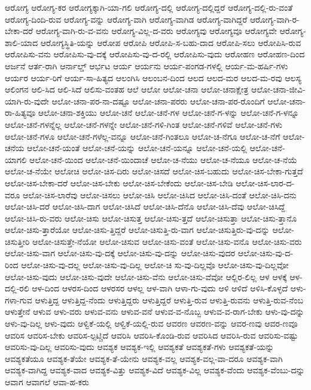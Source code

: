 {ಆರೋಗ್ಯ
ಆರೋಗ್ಯ-ಕರ
ಆರೋಗ್ಯಕ್ಕಾಗಿ-ಯಾ-ಗಲಿ
ಆರೋಗ್ಯ-ದಲ್ಲಿ
ಆರೋಗ್ಯ-ದಲ್ಲಿದ್ದರೆ
ಆರೋಗ್ಯ-ದಲ್ಲಿ-ರು-ವಂತೆ
ಆರೋಗ್ಯ-ದಿಂದಿ-ರುವ
ಆರೋಗ್ಯ-ವನ್ನು
ಆರೋಗ್ಯ-ವಾಗಿ
ಆರೋಗ್ಯ-ವಾಗಿಡ
ಆರೋಗ್ಯ-ವಾಗಿದ್ದರೆ
ಆರೋಗ್ಯ-ವಾಗಿ-ರ-ಬೇಕಾ-ದರೆ
ಆರೋಗ್ಯ-ವಾಗಿ-ರು-ವ-ವನು
ಆರೋಗ್ಯ-ವಿಲ್ಲ-ದ-ವರು
ಆರೋಗ್ಯವು
ಆರೋಗ್ಯವೂ
ಆರೋಗ್ಯವೇ
ಆರೋಗ್ಯ-ಶಾಲಿ-ಯಾದ
ಆರೋಗ್ಯಸ್ಥಿತಿ-ಯನ್ನು
ಆರೋಪ
ಆರೋಪಿ
ಆರೋಪಿ-ಸ-ಬಹು-ದಾದ
ಆರೋಪಿ-ಸಲು
ಆರೋಪಿಸಿ-ರುವ
ಆರೋಪಿಸು-ವನು
ಆರೋಪಿಸು-ವು-ದಕ್ಕೆ
ಆರೋಪಿಸು-ವು-ದ-ರಲ್ಲಿ
ಆರೋಪಿಸು-ವುದು
ಆರೋಹಣ
ಆರೋಹಣ-ದಿಂದ
ಆರ್ಜನೆ
ಆರ್ತ-ರಾಗಿ
ಆರ್ನಾಲ್ಡ್
ಆರ್ಭಟ
ಆರ್ಯ
ಆರ್ಯನು
ಆರ್ಯ-ಪಂಗಡ-ಗಳಲ್ಲಿ
ಆರ್ಯ-ಮ-ಹರ್ಷಿ-ಗಳು
ಆರ್ಯರ
ಆರ್ಯ-ರಿಗೆ
ಆರ್ಯ-ಸಾ-ಹಿತ್ಯದ
ಆಲಂಗಿಸಿ
ಆಲಂಬನ-ದಿಂದ
ಆಲದ
ಆಲದ-ಮರ
ಆಲದ-ಮ-ರವು
ಆಲಸ್ಯ
ಆಲಿಂಗನ
ಆಲಿ-ಸಿದ
ಆಲಿ-ಸಿದೆ
ಆಲಿಸು-ವಂತಹ
ಆಲೆ
ಆಲೋ
ಆಲೋ-ಚನಾ
ಆಲೋ-ಚನಾಕ್ಷೇತ್ರ
ಆಲೋ-ಚನಾ-ಜೀವಿ-ಯಾಗಿ-ರು-ವುದೇ
ಆಲೋ-ಚನಾ-ಪರ-ನಾ-ದಷ್ಟೂ
ಆಲೋ-ಚನಾ-ಪರರು
ಆಲೋ-ಚನಾ-ಪರ-ರೊಂದಿಗೆ
ಆಲೋ-ಚನಾ-ರಾ-ಹಿತ್ಯವೂ
ಆಲೋ-ಚನಾ-ಶಕ್ತಿಯು
ಆಲೋ-ಚನೆ
ಆಲೋ-ಚನೆ-ಗಳ
ಆಲೋ-ಚನೆ-ಗ-ಳನ್ನು
ಆಲೋ-ಚನೆ-ಗ-ಳನ್ನೂ
ಆಲೋ-ಚನೆ-ಗಳನ್ನೆಲ್ಲ
ಆಲೋ-ಚನೆ-ಗಳನ್ನೇ
ಆಲೋ-ಚನೆ-ಗಳಿ-ಗಿಂತ
ಆಲೋ-ಚನೆ-ಗಳಿವೆ
ಆಲೋ-ಚನೆ-ಗಳು
ಆಲೋ-ಚನೆ-ಗಳೂ
ಆಲೋ-ಚನೆ-ಗಳೆಲ್ಲ-ವನ್ನೂ
ಆಲೋ-ಚನೆ-ಗಿಂತಲೂ
ಆಲೋ-ಚ-ನೆಗೂ
ಆಲೋ-ಚ-ನೆಗೆ
ಆಲೋ-ಚನೆಯ
ಆಲೋ-ಚನೆ-ಯಂತೆ
ಆಲೋ-ಚನೆ-ಯನ್ನು
ಆಲೋ-ಚನೆ-ಯನ್ನೂ
ಆಲೋ-ಚನೆ-ಯಲ್ಲಿ
ಆಲೋ-ಚನೆ-ಯಾಗಲಿ
ಆಲೋ-ಚನೆ-ಯಿಂದ
ಆಲೋ-ಚನೆ-ಯಿಂದಾಚೆ
ಆಲೋ-ಚ-ನೆಯು
ಆಲೋ-ಚ-ನೆಯೂ
ಆಲೋ-ಚ-ನೆಯೆ
ಆಲೋ-ಚ-ನೆಯೇ
ಆಲೋಚಿ
ಆಲೋ-ಚಿಸ-ದಿರು
ಆಲೋ-ಚಿಸದೆ
ಆಲೋ-ಚಿಸ-ಬಹುದು
ಆಲೋ-ಚಿಸ-ಬೇಕಾ-ಗುತ್ತದೆ
ಆಲೋ-ಚಿಸ-ಬೇಕಾ-ದರೆ
ಆಲೋ-ಚಿಸ-ಬೇಕು
ಆಲೋ-ಚಿಸ-ಬೇಕೆಂದು
ಆಲೋ-ಚಿಸ-ಬೇಡಿ
ಆಲೋ-ಚಿಸ-ಲಾರ-ದ-ವರೂ
ಆಲೋ-ಚಿಸ-ಲಾರೆವು
ಆಲೋ-ಚಿಸಲು
ಆಲೋ-ಚಿಸಿ
ಆಲೋ-ಚಿಸಿದ
ಆಲೋ-ಚಿಸಿ-ದಂತೆ
ಆಲೋ-ಚಿಸಿ-ದನು
ಆಲೋ-ಚಿಸಿ-ದರೆ
ಆಲೋ-ಚಿಸಿ-ದಾಗ
ಆಲೋ-ಚಿಸಿದೆ
ಆಲೋ-ಚಿಸಿ-ದೆನೊ
ಆಲೋ-ಚಿಸಿ-ದೆವು
ಆಲೋ-ಚಿಸಿದ್ದೆ
ಆಲೋ-ಚಿಸಿ-ರು-ವರು
ಆಲೋ-ಚಿಸು
ಆಲೋ-ಚಿಸುತ್ತ
ಆಲೋ-ಚಿಸು-ತ್ತದೆ
ಆಲೋ-ಚಿಸುತ್ತಾ
ಆಲೋ-ಚಿಸು-ತ್ತಾನೊ
ಆಲೋ-ಚಿಸು-ತ್ತಾರೆಯೋ
ಆಲೋ-ಚಿಸು-ತ್ತಿದ್ದರೆ
ಆಲೋ-ಚಿಸುತ್ತಿ-ರು-ವಾಗ
ಆಲೋ-ಚಿಸುತ್ತಿರು-ವು-ದನ್ನು
ಆಲೋ-ಚಿಸುತ್ತೀರಿ
ಆಲೋ-ಚಿಸುತ್ತೇ-ನೆಯೋ
ಆಲೋ-ಚಿಸುವ
ಆಲೋ-ಚಿಸು-ವಂತೆ
ಆಲೋ-ಚಿಸು-ವನೊ
ಆಲೋ-ಚಿಸು-ವರು
ಆಲೋ-ಚಿಸು-ವಾಗ
ಆಲೋ-ಚಿಸು-ವು-ದಕ್ಕೆ
ಆಲೋ-ಚಿಸು-ವು-ದನ್ನು
ಆಲೋ-ಚಿಸು-ವುದರ
ಆಲೋ-ಚಿಸು-ವು-ದ-ರಿಂದ
ಆಲೋ-ಚಿಸು-ವು-ದಲ್ಲ
ಆಲೋ-ಚಿಸು-ವು-ದಿಲ್ಲ
ಆಲೋ-ಚಿ ಸು-ವು-ದಿಲ್ಲವೊ
ಆಲೋ-ಚಿಸು-ವು-ದಿಲ್ಲವೋ
ಆಲೋ-ಚಿಸು-ವುದು
ಆಲೋ-ಚಿಸು-ವುದೇ
ಆಲೋ-ಚಿಸು-ವೆನು
ಆಲೋ-ಚಿಸು-ವೆವೋ
ಆಲ್ಲಿರ-ಲಿಲ್ಲ
ಆಳ
ಆಳಕ್ಕೆ
ಆಳ-ದಲ್ಲಿ-ರಲಿ
ಆಳ-ದಿಂದ
ಆಳರಸ-ದಿಂದ
ಆಳರಸರ
ಆಳಲ್ಲ
ಆಳ-ವಾಗಿ
ಆಳಾ-ಗು-ವುದು
ಆಳಿ
ಆಳಿದೆ
ಆಳಿಸಿ-ಕೊಳ್ಳದೆ
ಆಳು-ಗಳಾ-ಗುವ
ಆಳುತ್ತಿದ್ದ
ಆಳುತ್ತಿದ್ದ-ನೆಂದು
ಆಳುತ್ತಿದ್ದರು
ಆಳುತ್ತಿದ್ದರೆ
ಆಳುತ್ತಿ-ರುವ
ಆಳುತ್ತಿ-ರುವನು
ಆಳುತ್ತಿ-ರುವ-ನೆಂಬ
ಆಳುತ್ತೇನೆ
ಆಳುವ
ಆಳು-ವರು
ಆಳುವ-ವನು
ಆಳುವ-ವನೆ
ಆಳುವ-ವ-ನೊಬ್ಬ
ಆಳುವ-ವ-ರಾಗ-ಬೇಕು
ಆಳು-ವು-ದನ್ನು
ಆಳು-ವು-ದಿಲ್ಲ
ಆಳು-ವುದು
ಆಳ್ವಿಕೆ-ಯಲ್ಲಿ
ಆಳ್ವಿಕೆ-ಯಲ್ಲಿ-ರುವ
ಆವರಣ
ಆವರಣ-ವನ್ನು
ಆವರ-ಣವು
ಆವರ-ಣವೂ
ಆವರಿಸ
ಆವರಿಸ-ಬೇಕು
ಆವರಿಸ-ಲ್ಪಟ್ಚಿದೆ
ಆವರಿಸಿ
ಆವರಿಸಿ-ಕೊಂಡಿ-ರುವ
ಆವರಿಸಿದ
ಆವರಿಸಿ-ರುವ
ಆವರಿಸು-ವಷ್ಟು
ಆವರಿಸು-ವು-ದಿಲ್ಲ
ಆವರಿಸು-ವುದು
ಆವಶ್ಯಕ
ಆವಶ್ಯಕ-ಇಲ್ಲಿ
ಆವಶ್ಯಕತೆ
ಆವಶ್ಯಕತೆ-ಗಳು
ಆವಶ್ಯಕತೆ-ಯನ್ನು
ಆವಶ್ಯಕತೆಯೂ
ಆವಶ್ಯಕ-ತೆಯೇ
ಆವಶ್ಯಕ-ತೆ-ಯೇನು
ಆವಶ್ಯಕ-ವಲ್ಲ
ಆವಶ್ಯಕ-ವಲ್ಲ-ವಾ-ದರೂ
ಆವಶ್ಯಕ-ವಾಗಿ
ಆವಶ್ಯಕ-ವಾಗಿದ್ದ
ಆವಶ್ಯಕ-ವಾದ
ಆವಶ್ಯಕ-ವಿತ್ತು
ಆವಶ್ಯಕ-ವಿದೆ
ಆವಶ್ಯಕ-ವಿಲ್ಲ
ಆವಶ್ಯಕ-ವೆಂದು
ಆವಶ್ಯಕ-ವೆಂಬು-ದನ್ನು
ಆವಾಗ
ಆವಾಗಲೆ
ಆವಾ-ಹ-ಕರು
}
